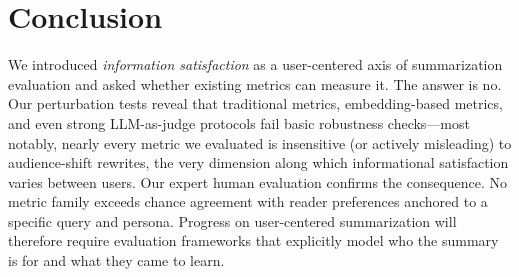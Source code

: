\clearpage
\section{Conclusion}

We introduced \textit{information satisfaction} as a user-centered axis of summarization evaluation and asked whether existing metrics can measure it. The answer is no. Our perturbation tests reveal that traditional metrics, embedding-based metrics, and even strong LLM-as-judge protocols fail basic robustness checks—most notably, nearly every metric we evaluated is insensitive (or actively misleading) to audience-shift rewrites, the very dimension along which informational satisfaction varies between users. Our expert human evaluation confirms the consequence. No metric family exceeds chance agreement with reader preferences anchored to a specific query and persona. Progress on user-centered summarization will therefore require evaluation frameworks that explicitly model who the summary is for and what they came to learn.
